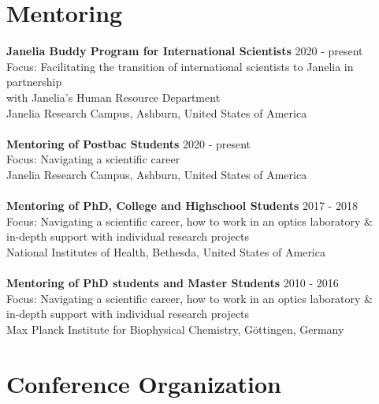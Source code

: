 \documentclass[margin,line]{res}
\begin{document}
\begin{resume}

\section{\sc Mentoring}

{\bf  Janelia Buddy Program for International Scientists} \hfill 2020 - present\\
Focus: Facilitating the transition of international scientists to Janelia in partnership \\
with Janelia's Human Resource Department\\
Janelia Research Campus, Ashburn, United States of America\\
\vspace*{-3mm}\\
{\bf  Mentoring of Postbac Students} \hfill 2020 - present\\
Focus: Navigating a scientific career\\
Janelia Research Campus, Ashburn, United States of America\\
\vspace*{-3mm}\\
{\bf  Mentoring of PhD, College and Highschool Students}  \hfill 2017 - 2018\\
Focus: Navigating a scientific career, how to work in an optics laboratory \&\\
in-depth support with individual research projects\\
National Institutes of Health, Bethesda, United States of America\\
\vspace*{-3mm}\\
{\bf Mentoring of PhD students and Master Students}  \hfill {2010 - 2016}\\
Focus: Navigating a scientific career, how to work in an optics laboratory \&\\
in-depth support with individual research projects\\
Max Planck Institute for Biophysical Chemistry, Göttingen, Germany \\


\section{\sc Conference Organization}


\end{resume}
\end{document}
